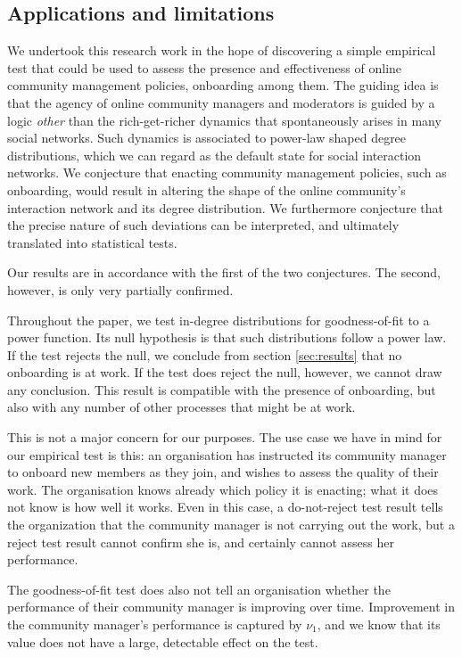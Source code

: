 \documentclass{bmcart}
\begin{document}
\subsection{Applications and limitations}
\label{ss:applications}
We undertook this research work in the hope of discovering a simple empirical test that could be used to assess the presence and effectiveness of online community management policies, onboarding among them. The guiding idea is that the agency of online community managers and moderators is guided by a logic \textit{other} than the rich-get-richer dynamics that spontaneously arises in many social networks. Such dynamics is associated to power-law shaped degree distributions, which we can regard as the default state for social interaction networks. We conjecture that enacting community management policies, such as onboarding, would result in altering the shape of the online community's interaction network and its degree distribution. We furthermore conjecture that the precise nature of such deviations can be interpreted, and ultimately translated into statistical tests. 

Our results are in accordance with the first of the two conjectures. The second, however, is only very partially confirmed. 

Throughout the paper, we test in-degree distributions for goodness-of-fit to a power function. Its null hypothesis is that such distributions follow a power law. If the test rejects the null, we conclude from section \ref{sec:results} that no onboarding is at work. If the test does reject the null, however, we cannot draw any conclusion. This result is compatible with the presence of onboarding, but also with any number of other processes that might be at work. 

This is not a major concern for our purposes. The use case we have in mind for our empirical test is this: an organisation has instructed its community manager to onboard new members as they join, and wishes to assess the quality of their work. The organisation knows already which policy it is enacting; what it does not know is how well it works. Even in this case, a do-not-reject test result tells the organization that the community manager is not carrying out the work, but a reject test result cannot confirm she is, and certainly cannot assess her performance.

The goodness-of-fit test does also not tell an organisation whether the performance of their community manager is improving over time. Improvement in the community manager's performance is captured by $\nu_1$, and we know that its value does not have a large, detectable effect on the test. 
\end{document}
